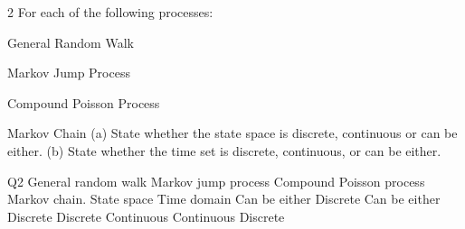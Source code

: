 \documentclass[a4paper,12pt]{article}
\begin{document}
2
For each of the following processes:
\item  General Random Walk
\item  Markov Jump Process
\item  Compound Poisson Process
\item  Markov Chain
(a)
State whether the state space is discrete, continuous or can be either.
(b)
State whether the time set is discrete, continuous, or can be either.




Q2
General random walk
Markov jump process
Compound Poisson process
Markov chain.
State space Time domain
Can be either
Discrete
Can be either
Discrete Discrete
Continuous
Continuous
Discrete

\end{document}
